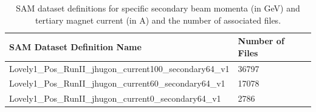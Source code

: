 \documentclass[letterpaper,12pt]{article}
\begin{document}

\begin{table}[!hbtp]
  \begin{center}
    \caption{SAM dataset definitions for specific secondary beam momenta (in GeV) 
                and tertiary magnet current (in A) and the number of associated files.}
    \label{tab:samSpecificDatasets}
    \small
    \begin{tabu}{|l|l|} \hline
      SAM Dataset Definition Name & Number of Files \\ \hline \hline
      Lovely1\_Pos\_RunII\_jhugon\_current100\_secondary64\_v1   & 36797 \\ \hline
      Lovely1\_Pos\_RunII\_jhugon\_current60\_secondary64\_v1    & 17078 \\ \hline
      Lovely1\_Pos\_RunII\_jhugon\_current0\_secondary64\_v1     & 2786  \\ \hline
    \end{tabu}
  \end{center}
\end{table}
\end{document}
